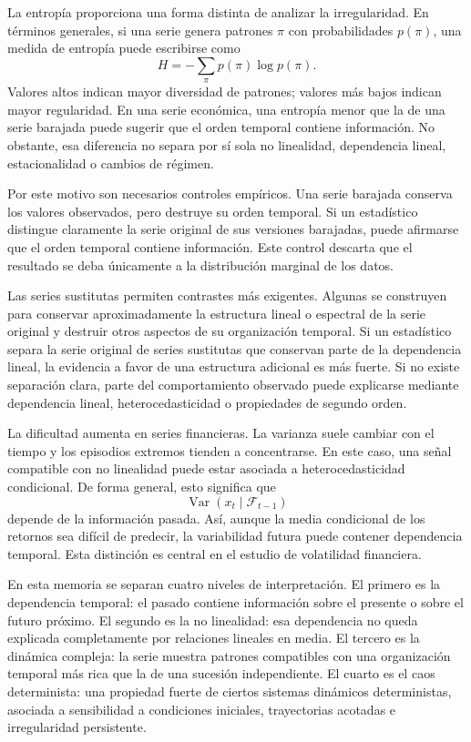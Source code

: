 La entropía proporciona una forma distinta de analizar la irregularidad. En términos generales, si una serie genera patrones \(\pi\) con probabilidades \(p(\pi)\), una medida de entropía puede escribirse como
\begin{equation}
    H = -\sum_{\pi} p(\pi)\log p(\pi).
\end{equation}
Valores altos indican mayor diversidad de patrones; valores más bajos indican mayor regularidad. En una serie económica, una entropía menor que la de una serie barajada puede sugerir que el orden temporal contiene información. No obstante, esa diferencia no separa por sí sola no linealidad, dependencia lineal, estacionalidad o cambios de régimen.

Por este motivo son necesarios controles empíricos. Una serie barajada conserva los valores observados, pero destruye su orden temporal. Si un estadístico distingue claramente la serie original de sus versiones barajadas, puede afirmarse que el orden temporal contiene información. Este control descarta que el resultado se deba únicamente a la distribución marginal de los datos.

Las series sustitutas permiten contrastes más exigentes. Algunas se construyen para conservar aproximadamente la estructura lineal o espectral de la serie original y destruir otros aspectos de su organización temporal. Si un estadístico separa la serie original de series sustitutas que conservan parte de la dependencia lineal, la evidencia a favor de una estructura adicional es más fuerte. Si no existe separación clara, parte del comportamiento observado puede explicarse mediante dependencia lineal, heterocedasticidad o propiedades de segundo orden.

La dificultad aumenta en series financieras. La varianza suele cambiar con el tiempo y los episodios extremos tienden a concentrarse. En este caso, una señal compatible con no linealidad puede estar asociada a heterocedasticidad condicional. De forma general, esto significa que
\begin{equation}
    \operatorname{Var}(x_t \mid \mathcal{F}_{t-1})
\end{equation}
depende de la información pasada. Así, aunque la media condicional de los retornos sea difícil de predecir, la variabilidad futura puede contener dependencia temporal. Esta distinción es central en el estudio de volatilidad financiera.

En esta memoria se separan cuatro niveles de interpretación. El primero es la dependencia temporal: el pasado contiene información sobre el presente o sobre el futuro próximo. El segundo es la no linealidad: esa dependencia no queda explicada completamente por relaciones lineales en media. El tercero es la dinámica compleja: la serie muestra patrones compatibles con una organización temporal más rica que la de una sucesión independiente. El cuarto es el caos determinista: una propiedad fuerte de ciertos sistemas dinámicos deterministas, asociada a sensibilidad a condiciones iniciales, trayectorias acotadas e irregularidad persistente.

